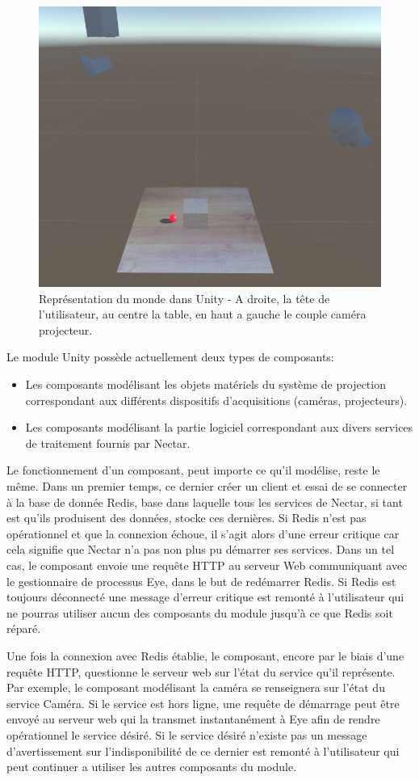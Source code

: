 \begin{figure}[h]
\centering
\includegraphics[width=0.65\linewidth]{images/unityscene}
\caption{Représentation du monde dans Unity - A droite, la tête de l'utilisateur, au centre la table, en haut a gauche le couple caméra projecteur.}
\label{fig:unityrealworld}
\end{figure}

Le module Unity possède actuellement deux types de composants:
\begin{itemize}
\item Les composants modélisant les objets matériels du système de projection correspondant aux différents dispositifs d'acquisitions (caméras, projecteurs).
\item Les composants modélisant la partie logiciel correspondant aux divers services de traitement fournis par Nectar.
\end{itemize}

Le fonctionnement d'un composant, peut importe ce qu'il modélise, reste le même. Dans un premier temps, ce dernier créer un client et essai de se connecter à la base de donnée Redis, base dans laquelle tous les services de Nectar, si tant est qu'ils produisent des données, stocke ces dernières. Si Redis n'est pas opérationnel et que la connexion échoue, il s'agit alors d'une erreur critique car cela signifie que Nectar n'a pas non plus pu démarrer ses services. Dans un tel cas, le composant envoie une requête HTTP au serveur Web communiquant avec le gestionnaire de processus Eye, dans le but de redémarrer Redis. Si Redis est toujours déconnecté une message d'erreur critique est remonté à l'utilisateur qui ne pourras utiliser aucun des composants du module jusqu'à ce que Redis soit réparé.

Une fois la connexion avec Redis établie, le composant, encore par le biais d'une requête HTTP, questionne le serveur web sur l'état du service qu'il représente. Par exemple, le composant modélisant la caméra se renseignera sur l'état du service Caméra. Si le service est hors ligne, une requête de démarrage peut être envoyé au serveur web qui la transmet instantanément à Eye afin de rendre opérationnel le service désiré. Si le service désiré n'existe pas un message d'avertissement sur l'indisponibilité de ce dernier est remonté à l'utilisateur qui peut continuer a utiliser les autres composants du module.

